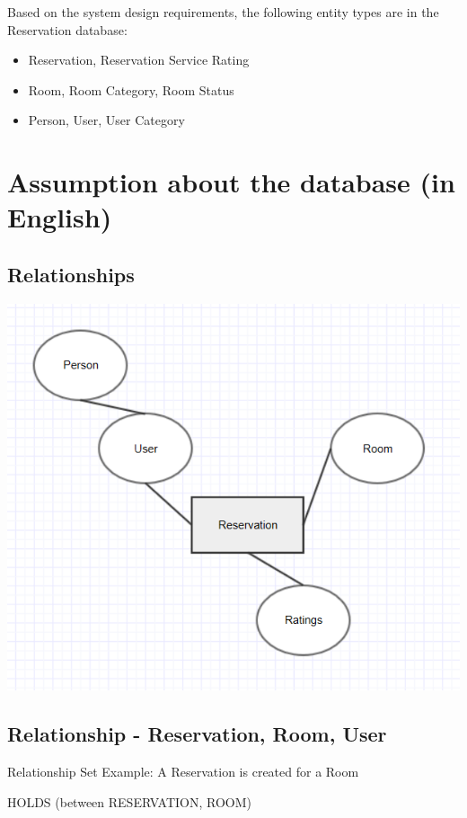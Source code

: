 \documentclass[11pt]{report}
\begin{document}
Based on the system design requirements, the following entity types are in the Reservation database:
\begin{itemize}
    \item Reservation,  Reservation Service Rating
    \item Room, Room Category, Room Status
    \item Person, User, User Category
\end{itemize}

\section*{Assumption about the database (in English)}
\subsection*{Relationships}
\begin{center}
\includegraphics{reservation_conceptual.PNG}
\end{center}
\pagebreak

\subsection*{Relationship - Reservation, Room, User}
Relationship Set Example: A Reservation is created for a Room

\setlength{\parindent}{5ex}
 
 HOLDS (between RESERVATION, ROOM)
 
\end{document}
